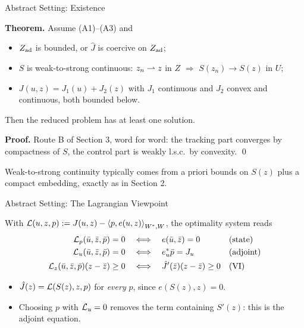 \documentclass[main.tex]{subfiles}
\begin{document}
\begin{frame}{Abstract Setting: Existence}
  \begin{qbox}
    \textbf{Theorem.} Assume (A1)--(A3) and
    \begin{itemize}
      \item $Z_{\rm ad}$ is bounded, or $\hat J$ is coercive on $Z_{\rm ad}$;
      \item $S$ is weak-to-strong continuous: $z_n \rightharpoonup z$ in $Z$ $\Rightarrow$ $S(z_n) \to S(z)$ in $U$;
      \item $J(u,z) = J_1(u) + J_2(z)$ with $J_1$ continuous and $J_2$ convex and continuous, both bounded below.
    \end{itemize}
    Then the reduced problem has at least one solution.
  \end{qbox}

  \begin{hlbox}
    \textbf{Proof.} Route B of Section 3, word for word: the tracking part converges by compactness of $S$, the control part is weakly l.s.c.\ by convexity. \hfill \qed
  \end{hlbox}

  \begin{hlbox}
    Weak-to-strong continuity typically comes from a priori bounds on $S(z)$ plus a compact embedding, exactly as in Section 2.
  \end{hlbox}
  \vfill\hfill\hyperlink{general<3>}{}
\end{frame}

\begin{frame}{Abstract Setting: The Lagrangian Viewpoint}
  \begin{hlbox}
    With $\mathcal{L}(u,z,p) := J(u,z) - \left\langle p, e(u,z) \right\rangle_{W^*,W}$, the optimality system reads
    \[
      \begin{aligned}
        \mathcal{L}_p(\bar u,\bar z,\bar p) &= 0 &&\Longleftrightarrow\quad e(\bar u,\bar z) = 0 && \text{(state)}\\
        \mathcal{L}_u(\bar u,\bar z,\bar p) &= 0 &&\Longleftrightarrow\quad e_u^*\bar p = J_u && \text{(adjoint)}\\
        \mathcal{L}_z(\bar u,\bar z,\bar p)(z - \bar z) &\ge 0 &&\Longleftrightarrow\quad \hat J'(\bar z)(z-\bar z) \ge 0 && \text{(VI)}
      \end{aligned}
    \]
  \end{hlbox}

  \begin{hlbox}
    \begin{itemize}
      \item $\hat J(z) = \mathcal{L}(S(z),z,p)$ for \emph{every} $p$, since $e(S(z),z) = 0$.
      \item Choosing $p$ with $\mathcal{L}_u = 0$ removes the term containing $S'(z)$: this is the adjoint equation.
    \end{itemize}
  \end{hlbox}
  \vfill\hfill\hyperlink{general<3>}{}
\end{frame}
\end{document}
